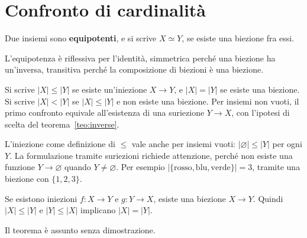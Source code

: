 \begin{schema}
\end{schema}

\section{Confronto di cardinalità}
\begin{definizione}
Due insiemi sono \textbf{equipotenti}, e si scrive $X\simeq Y$, se esiste una biezione fra essi.
\end{definizione}
L'equipotenza è riflessiva per l'identità, simmetrica perché una biezione ha un'inversa, transitiva perché la composizione di biezioni è una biezione.

\begin{definizione}
Si scrive $|X|\le|Y|$ se esiste un'iniezione $X\to Y$, e $|X|=|Y|$ se esiste una biezione. Si scrive $|X|<|Y|$ se $|X|\le|Y|$ e non esiste una biezione. Per insiemi non vuoti, il primo confronto equivale all'esistenza di una suriezione $Y\to X$, con l'ipotesi di scelta del teorema~\ref{teo:inverse}.
\end{definizione}

\begin{osservazione}
L'iniezione come definizione di $\le$ vale anche per insiemi vuoti: $|\varnothing|\le|Y|$ per ogni $Y$. La formulazione tramite suriezioni richiede attenzione, perché non esiste una funzione $Y\to\varnothing$ quando $Y\ne\varnothing$. Per esempio $|\{\text{rosso},\text{blu},\text{verde}\}|=3$, tramite una biezione con $\{1,2,3\}$.
\end{osservazione}

\begin{teorema}\label{teo:csb}
Se esistono iniezioni $f:X\to Y$ e $g:Y\to X$, esiste una biezione $X\to Y$. Quindi $|X|\le|Y|$ e $|Y|\le|X|$ implicano $|X|=|Y|$.
\end{teorema}
Il teorema è assunto senza dimostrazione.

